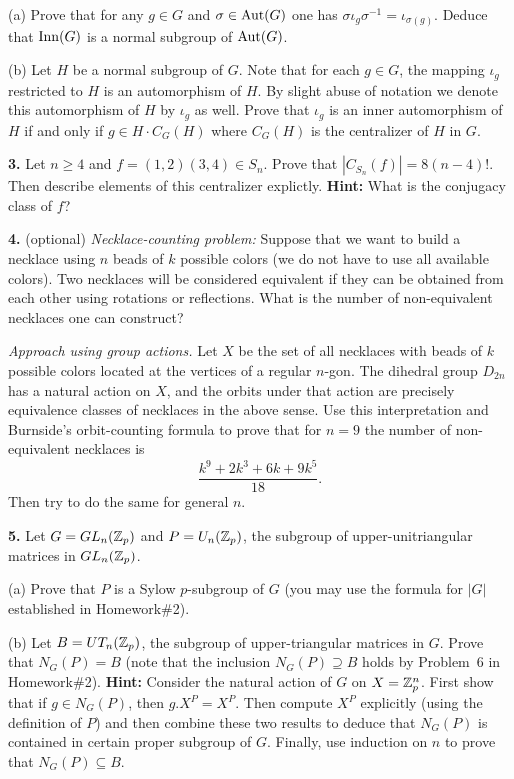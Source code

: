 \documentclass[12pt]{article}
\begin{document}
(a) Prove that for any $g\in G$ and $\sigma\in {\rm Aut}(G)$
one has $\sigma \iota_g \sigma^{-1}=\iota_{\sigma(g)}$.
Deduce that ${\rm Inn}(G)$ is a normal subgroup of ${\rm Aut}(G)$.

(b) Let $H$ be a normal subgroup of $G$. Note that for each $g\in G$, 
the mapping $\iota_g$ restricted to $H$
is an automorphism of $H$. By slight abuse of notation
we denote this automorphism of $H$ by $\iota_g$ as well.
Prove that $\iota_g$ is an inner automorphism of $H$ if and
only if $g\in H\cdot C_{G}(H)$ where $C_G(H)$ is the centralizer
of $H$ in $G$.
\skv

{\bf 3.} Let $n\geq 4$ and $f=(1,2)(3,4)\in S_n$. Prove that 
$|C_{S_n}(f)|=8 (n-4)!$. Then describe elements of this 
centralizer explictly. {\bf Hint:} What is the conjugacy
class of $f$?
\skv

{\bf 4.} (optional) {\it Necklace-counting problem:}
Suppose that we want to build a necklace using $n$ beads of $k$ possible colors
(we do not have to use all available colors). Two necklaces will be considered equivalent 
if they can be obtained from each other using rotations or reflections. What is the number 
of non-equivalent necklaces one can construct?

{\it Approach using group actions.} Let $X$ be the set of all necklaces with
beads of $k$ possible colors located at the vertices of a regular $n$-gon. The dihedral
group $D_{2n}$ has a natural action on $X$, and the orbits under that action
are precisely equivalence classes of necklaces in the above sense. Use this
interpretation and Burnside's orbit-counting formula to prove that for $n=9$ the number of 
non-equivalent necklaces is
$$\frac{k^9+2k^3+6k+9k^5}{18}.$$
Then try to do the same for general $n$. 

{\bf 5.} Let $G=GL_n({\mathbb Z}_p)$ and $P=U_n({\mathbb Z}_p)$,
the subgroup of upper-unitriangular matrices in $GL_n({\mathbb Z}_p)$.

(a) Prove that $P$ is a Sylow $p$-subgroup of $G$
(you may use the formula for $|G|$ established in Homework\#2).

(b) Let $B=UT_n({\mathbb Z}_p)$, the subgroup of upper-triangular matrices in $G$.
Prove that $N_G(P)=B$ (note that the inclusion $N_G(P)\supseteq B$ holds
by Problem~6 in Homework\#2). {\bf Hint: } Consider the natural action
of $G$ on $X={\mathbb Z}_p^n$. First show that if $g\in N_G(P)$, then $g . X^P=X^P$.
Then compute $X^P$ explicitly (using the definition of $P$) and then combine
these two results to deduce that $N_G(P)$ is contained in certain proper subgroup
of $G$. Finally, use induction on $n$ to prove that $N_G(P)\subseteq B$.
\end{document}
